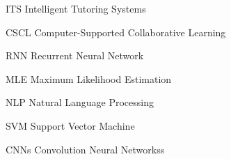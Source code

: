 \documentclass[letterpaper%
, twoside%
, 12pt%
,these%
, english%
,creativecommons,hyperref, withAlgo2e %
]{thETS}
\begin{document}
\begin{listofsymbols}[3cm]
\item [ITS] Intelligent Tutoring Systems
\item [CSCL]  Computer-Supported Collaborative Learning
\item [RNN] Recurrent Neural Network 
\item [MLE] Maximum Likelihood Estimation
\item [NLP] Natural Language Processing
\item [SVM] Support Vector Machine
\item [CNNs] Convolution Neural Networkss

\end{listofsymbols}


\cleardoublepage


\reversemarginpar

\end{document}
